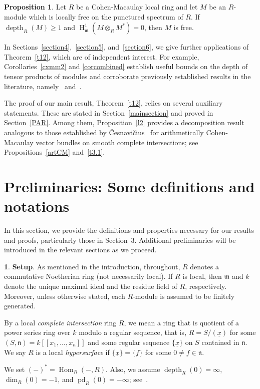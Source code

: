 \documentclass[11pt]{amsart}
\theoremstyle{definition}
\newtheorem{prop}[thm]{Proposition}
\theoremstyle{definition}
\newtheorem{chunk}[thm]{\hspace*{-1.065ex}\bf}
\numberwithin{equation}{section}
\newcommand{\fm}{\mathfrak{m}}
\newcommand{\fn}{\mathfrak{n}}
\DeclareMathOperator{\depth}{depth}
\DeclareMathOperator{\hh}{H}
\DeclareMathOperator{\Hom}{Hom}
\DeclareMathOperator{\pd}{pd}
\begin{document}
\begin{prop} Let $R$ be a Cohen-Macaulay local ring and let $M$ be an $R$-module which is locally free on the punctured spectrum of $R$. If $\depth_R(M)\geq 1$ and $\hh^1_{\fm}(M\otimes_RM^*)=0$, then $M$ is free.
\end{prop}

In Sections~\ref{section4},~\ref{section5}, and~\ref{section6}, we give further applications of Theorem~\ref{t12}, which are of independent interest. For example, Corollaries~\ref{cxmm2} and \ref{corcombined} establish useful bounds on the depth of tensor products of modules and corroborate previously established results in the literature, namely~\cite[3.1]{AOMCM} and~\cite[1.4]{CST}.

The proof of our main result, Theorem~\ref{t12}, relies on several auxiliary statements. These are stated in Section~\ref{mainsection} and proved in Section~\ref{PAR}. Among them, Proposition~\ref{l2} provides a decomposition result analogous to those established by \v{C}esnavi\v{c}ius~\cite{KC} for arithmetically Cohen-Macaulay vector bundles on smooth complete intersections; see Propositions~\ref{artCM} and~\ref{t3.1}.


\section{Preliminaries: Some definitions and notations}

In this section, we provide the definitions and properties necessary for our results and proofs, particularly those in Section~3. Additional preliminaries will be introduced in the relevant sections as we proceed.

\begin{chunk} \textbf{Setup}. As mentioned in the introduction, throughout, $R$ denotes a commutative Noetherian ring (not necessarily local). If $R$ is local, then $\fm$ and $k$ denote the unique maximal ideal and the residue field of $R$, respectively. Moreover, unless otherwise stated, each $R$-module is assumed to be finitely generated. 

By a local \emph{complete intersection} ring $R$, we mean a ring that is quotient of a power series ring over $k$ modulo a regular sequence, that is, $R=S/(\underline{x})$ for some $(S, \fn)=k[\![x_1, \ldots, x_n]\!]$ and some regular sequence $\{\underline{x}\}$ on $S$ contained in $\fn$. We say $R$ is a local \emph{hypersurface} if $\{\underline{x}\}=\{f\}$ for some $0\neq f\in \fn$.

We set $(-)^{\ast}=\Hom_R(-,R)$. Also, we assume $\depth_R(0)=\infty$, $\dim_R(0)=-1$, and $\pd_R(0)=-\infty$; see~\cite{Au}.
\end{chunk}
\end{document}
